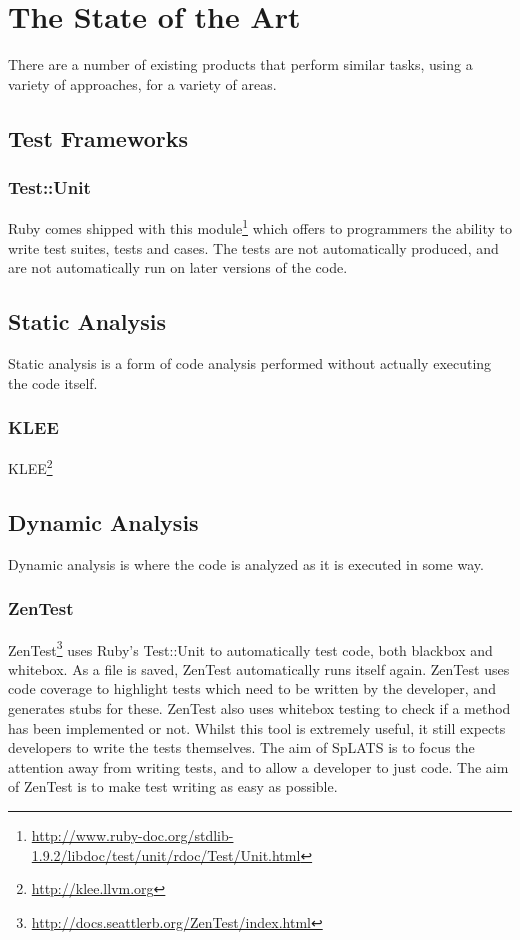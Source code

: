 \chapter{The State of the Art}

  There are a number of existing products that perform similar tasks, using a variety of approaches, for a variety of areas.

\section{Test Frameworks}

  \subsection{Test::Unit}
    Ruby comes shipped with this module\footnote{\url{http://www.ruby-doc.org/stdlib-1.9.2/libdoc/test/unit/rdoc/Test/Unit.html}} which offers to programmers the ability to write test suites, tests and cases.
    The tests are not automatically produced, and are not automatically run on later versions of the code.

\section{Static Analysis}

  Static analysis is a form of code analysis performed without actually executing the code itself.

  \subsection{KLEE}
    KLEE\footnote{\url{http://klee.llvm.org}}

\section{Dynamic Analysis} 

  Dynamic analysis is where the code is analyzed as it is executed in some way.

  \subsection{ZenTest}
    ZenTest\footnote{\url{http://docs.seattlerb.org/ZenTest/index.html}} uses Ruby's Test::Unit to automatically test code, both blackbox and whitebox.
    As a file is saved, ZenTest automatically runs itself again.
    ZenTest uses code coverage to highlight tests which need to be written by the developer, and generates stubs for these.
    ZenTest also uses whitebox testing to check if a method has been implemented or not.
    Whilst this tool is extremely useful, it still expects developers to write the tests themselves.
    The aim of SpLATS is to focus the attention away from writing tests, and to allow a developer to just code.
    The aim of ZenTest is to make test writing as easy as possible.

